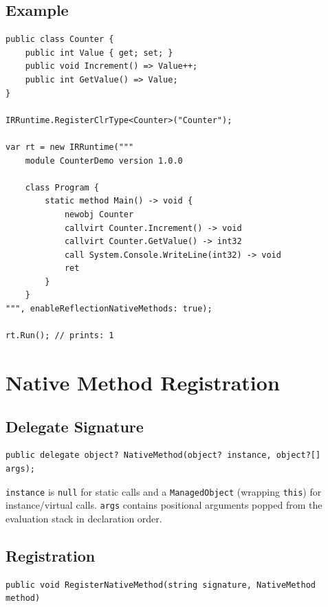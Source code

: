 \documentclass[11pt,a4paper]{article}
\newcommand{\code}[1]{\texttt{\small #1}}
\newcommand{\typename}[1]{\textcolor{typecolor}{\texttt{\small #1}}}
\begin{document}
\subsection{Example}

\begin{lstlisting}[style=cs]
public class Counter {
    public int Value { get; set; }
    public void Increment() => Value++;
    public int GetValue() => Value;
}

IRRuntime.RegisterClrType<Counter>("Counter");

var rt = new IRRuntime("""
    module CounterDemo version 1.0.0

    class Program {
        static method Main() -> void {
            newobj Counter
            callvirt Counter.Increment() -> void
            callvirt Counter.GetValue() -> int32
            call System.Console.WriteLine(int32) -> void
            ret
        }
    }
""", enableReflectionNativeMethods: true);

rt.Run(); // prints: 1
\end{lstlisting}

\section{Native Method Registration}
\label{sec:native}

\subsection{Delegate Signature}

\begin{lstlisting}[style=cs]
public delegate object? NativeMethod(object? instance, object?[] args);
\end{lstlisting}

\code{instance} is \code{null} for static calls and a \typename{ManagedObject}
(wrapping \texttt{this}) for instance/virtual calls. \code{args} contains
positional arguments popped from the evaluation stack in declaration order.

\subsection{Registration}

\begin{lstlisting}[style=cs]
public void RegisterNativeMethod(string signature, NativeMethod method)
\end{lstlisting}
\end{document}
